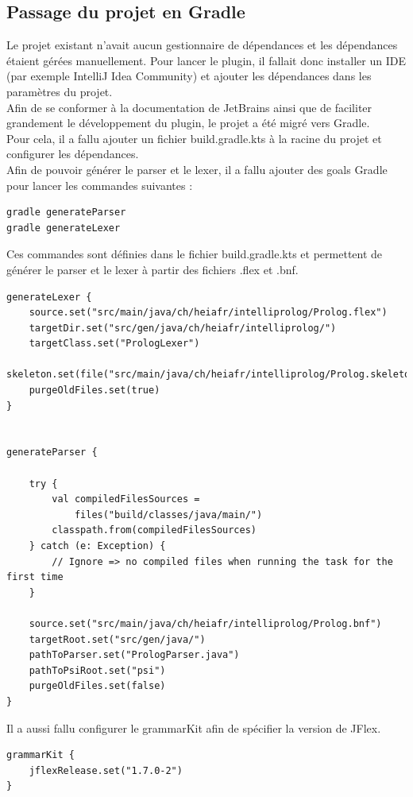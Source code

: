 \subsection{Passage du projet en Gradle}
\noindent
Le projet existant n'avait aucun gestionnaire de dépendances et les dépendances étaient gérées manuellement.
Pour lancer le plugin, il fallait donc installer un IDE (par exemple IntelliJ Idea Community) et ajouter les dépendances dans les paramètres du projet.
\\ \noindent Afin de se conformer à la documentation de JetBrains ainsi que de faciliter grandement le développement du plugin, le projet a été migré vers Gradle.
\\\noindent Pour cela, il a fallu ajouter un fichier build.gradle.kts à la racine du projet et configurer les dépendances.
\\ \noindent Afin de pouvoir générer le parser et le lexer, il a fallu ajouter des goals Gradle pour lancer les commandes suivantes :
\begin{lstlisting}
gradle generateParser
gradle generateLexer
\end{lstlisting}


\noindent Ces commandes sont définies dans le fichier build.gradle.kts et permettent de générer le parser et le lexer à partir des fichiers .flex et .bnf.
\begin{lstlisting}
generateLexer {
    source.set("src/main/java/ch/heiafr/intelliprolog/Prolog.flex")
    targetDir.set("src/gen/java/ch/heiafr/intelliprolog/")
    targetClass.set("PrologLexer")
    skeleton.set(file("src/main/java/ch/heiafr/intelliprolog/Prolog.skeleton"))
    purgeOldFiles.set(true)
}


generateParser {

    try {
        val compiledFilesSources =
            files("build/classes/java/main/")
        classpath.from(compiledFilesSources)
    } catch (e: Exception) {
        // Ignore => no compiled files when running the task for the first time
    }

    source.set("src/main/java/ch/heiafr/intelliprolog/Prolog.bnf")
    targetRoot.set("src/gen/java/")
    pathToParser.set("PrologParser.java")
    pathToPsiRoot.set("psi")
    purgeOldFiles.set(false)
}
\end{lstlisting}
\noindent Il a aussi fallu configurer le grammarKit afin de spécifier la version de JFlex.

\begin{lstlisting}
grammarKit {
    jflexRelease.set("1.7.0-2")
}
\end{lstlisting}

